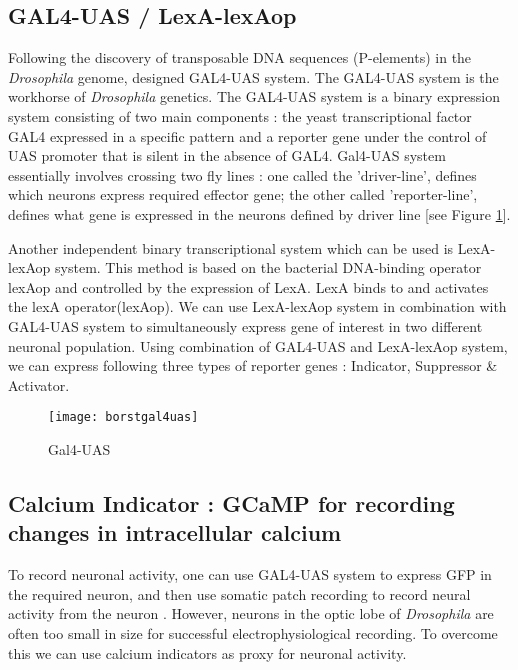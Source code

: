 \subsection{GAL4-UAS / LexA-lexAop}
Following the discovery of transposable DNA sequences (P-elements) in the \textit{Drosophila} genome\parencite{Rubin1982}, \cite{Brand1993} designed GAL4-UAS system. The GAL4-UAS system is the workhorse of \textit{Drosophila} genetics. The GAL4-UAS system is a binary expression system consisting of two main components : the yeast transcriptional factor GAL4 expressed in a specific pattern and a reporter gene under the control of UAS promoter that is silent in the absence of GAL4. Gal4-UAS system essentially involves crossing two fly lines : one called the 'driver-line', defines which neurons express required effector gene; the other called 'reporter-line', defines what gene is expressed in the neurons defined by driver line [see Figure  \ref{fig:gal4uas}]. 

Another independent binary transcriptional system which can be used is LexA-lexAop system. This method is based on the bacterial DNA-binding operator lexAop and controlled by the expression of LexA. LexA binds to and activates the lexA operator(lexAop). We can use LexA-lexAop system in combination with GAL4-UAS system to simultaneously express gene of interest in two different neuronal population. Using combination of GAL4-UAS and LexA-lexAop system, we can express following three types of reporter genes : Indicator, Suppressor \& Activator.
\begin{figure}[h]
\centering
\texttt{[image: borstgal4uas]}
\caption{Gal4-UAS}
\label{fig:gal4uas}
\end{figure}
\subsection{Calcium Indicator : GCaMP for recording changes in intracellular calcium}
To record neuronal activity, one can use GAL4-UAS system to express GFP in the required neuron, and then use somatic patch recording to record neural activity from the neuron \parencite{Wilson2004, Joesch2008}. However, neurons in the optic lobe of \textit{Drosophila} are often too small in size for successful electrophysiological recording. To overcome this we can use calcium indicators as proxy for neuronal activity. 

